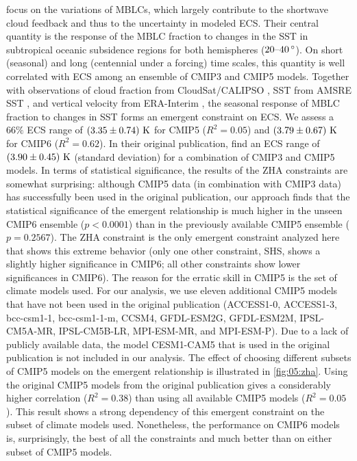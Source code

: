 \textcite{Zhai2015} focus on the variations of \acp{MBLC}, which largely
contribute to the shortwave cloud feedback and thus to the uncertainty in
modeled \ac{ECS}. Their central quantity is the response of the \ac{MBLC}
fraction to changes in the \ac{SST} in subtropical oceanic subsidence regions
for both hemispheres ($\rangeunit{20}{40}{\degree}$). On short (seasonal) and
long (centennial under a forcing) time scales, this quantity is well correlated
with \ac{ECS} among an ensemble of \acs{CMIP}3 and \acs{CMIP}5 models. Together
with observations of cloud fraction from CloudSat/CALIPSO \autocite{Mace2009},
\ac{SST} from AMSRE \ac{SST} \autocite{AMSRE2011}, and vertical velocity from
ERA-Interim \autocite{Dee2011}, the seasonal response of \ac{MBLC} fraction to
changes in \ac{SST} forms an emergent constraint on \ac{ECS}. We assess a $66
\unit{\%}$ \ac{ECS} range of $\pmrangeunit{3.35}{0.74}{K}$ for \acs{CMIP}5
($R^2 = 0.05$) and $\pmrangeunit{3.79}{0.67}{K}$ for \acs{CMIP}6 ($R^2 =
0.62$). In their original publication, \textcite{Zhai2015} find an \ac{ECS}
range of $\pmrangeunit{3.90}{0.45}{K}$ (standard deviation) for a combination
of \acs{CMIP}3 and \acs{CMIP}5 models. In terms of statistical significance,
the results of the ZHA constraints are somewhat surprising: although
\acs{CMIP}5 data (in combination with \acs{CMIP}3 data) has successfully been
used in the original publication, our approach finds that the statistical
significance of the emergent relationship is much higher in the unseen
\acs{CMIP}6 ensemble ($p < 0.0001$) than in the previously available
\acs{CMIP}5 ensemble ($p = 0.2567$). The ZHA constraint is the only emergent
constraint analyzed here that shows this extreme behavior (only one other
constraint, SHS, shows a slightly higher significance in \acs{CMIP}6; all other
constraints show lower significances in \acs{CMIP}6). The reason for the
erratic skill in \acs{CMIP}5 is the set of climate models used. For our
analysis, we use eleven additional \acs{CMIP}5 models that have not been used
in the original publication (ACCESS1-0, ACCESS1-3, bcc-csm1-1, bcc-csm1-1-m,
CCSM4, GFDL-ESM2G, GFDL-ESM2M, IPSL-CM5A-MR, IPSL-CM5B-LR, MPI-ESM-MR, and
MPI-ESM-P). Due to a lack of publicly available data, the model
\acs{CESM}1-CAM5 that is used in the original publication is not included in
our analysis. The effect of choosing different subsets of \acs{CMIP}5 models on
the emergent relationship is illustrated in \cref{fig:05:zha}. Using the
original \acs{CMIP}5 models from the original publication gives a considerably
higher correlation ($R^2 = 0.38$) than using all available \acs{CMIP}5 models
($R^2 = 0.05$). This result shows a strong dependency of this emergent
constraint on the subset of climate models used. Nonetheless, the performance
on \acs{CMIP}6 models is, surprisingly, the best of all the constraints and
much better than on either subset of \acs{CMIP}5 models.


